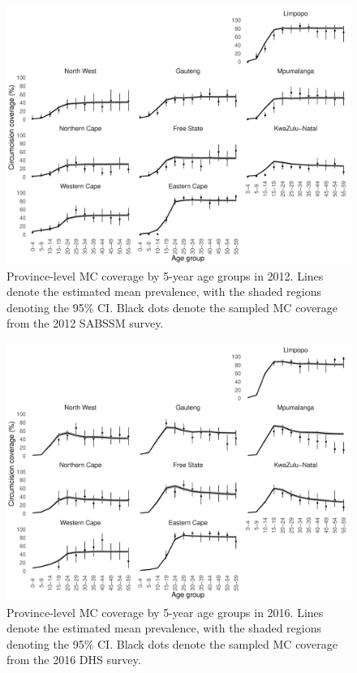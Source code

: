 \documentclass{article}
\begin{document}
\begin{appendix}

\begin{figure}[H]
	\centering
	\includegraphics[width = \linewidth]{Figures/suppmat/ModelFit/TotalPrev_5year_Province_2012_withsurveypoints}
	\caption{Province-level MC coverage by 5-year age groups in 2012. Lines denote the estimated mean prevalence, with the shaded regions denoting the 95\% CI. Black dots denote the sampled MC coverage from the 2012 SABSSM survey.}
\end{figure}


\begin{figure}[H]
	\centering
	\includegraphics[width = \linewidth]{Figures/suppmat/ModelFit/TotalPrev_5year_Province_2016_withsurveypoints}
	\caption{Province-level MC coverage by 5-year age groups in 2016. Lines denote the estimated mean prevalence, with the shaded regions denoting the 95\% CI. Black dots denote the sampled MC coverage from the 2016 DHS survey.}
\end{figure}


\end{appendix}
\end{document}

